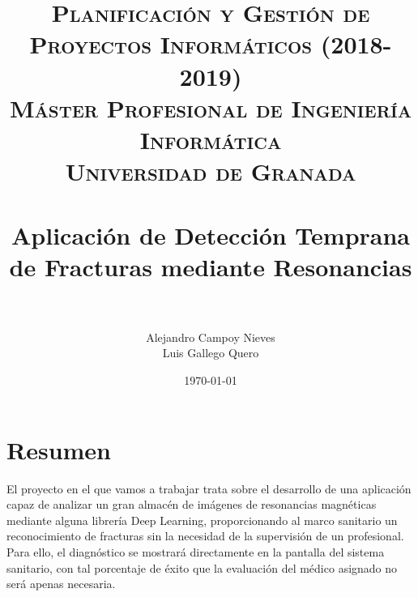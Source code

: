 


\title{	
	\normalfont \normalsize 
	\textsc{\textbf{Planificación y Gestión de Proyectos Informáticos (2018-2019)} \\ Máster Profesional de Ingeniería Informática \\ Universidad de Granada} \\ [25pt] %
	\horrule{0.5pt} \\[0.4cm] %
	\huge Aplicación de Detección Temprana de Fracturas mediante Resonancias \\ %
	\horrule{2pt} \\[0.5cm] %
}

\author{Alejandro Campoy Nieves \\ Luis Gallego Quero} %
\date{\normalsize\today} %
\usepackage{graphicx}
\usepackage{hyperref} %




\maketitle %

\newpage %

\tableofcontents %



\newpage		
 
\section{Resumen}

El proyecto en el que vamos a trabajar trata sobre el desarrollo de una aplicación capaz de analizar un gran almacén de imágenes de resonancias magnéticas mediante alguna librería Deep Learning, proporcionando al marco sanitario un reconocimiento de fracturas sin la necesidad de la supervisión de un profesional. Para ello, el diagnóstico se mostrará directamente en la pantalla del sistema sanitario, con tal porcentaje de éxito que la evaluación del médico asignado no será apenas necesaria.  \\

